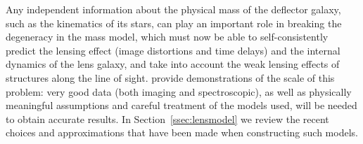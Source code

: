Any independent information about  the physical mass of the deflector
galaxy, such as the kinematics of its stars, can play an important role
in breaking the degeneracy in the mass model, which must now be able to
self-consistently predict the lensing effect (image distortions and time
delays) and the internal dynamics of the lens galaxy, and take into
account the weak lensing effects of structures along the line of sight.
\citet{S+S13} provide demonstrations of the scale of this problem: very
good data (both imaging and spectroscopic), as well as physically
meaningful assumptions and careful treatment of the models used, will
be needed to obtain accurate results.  In Section~\ref{ssec:lensmodel}
we review the recent choices and approximations that have been made
when constructing such models.


